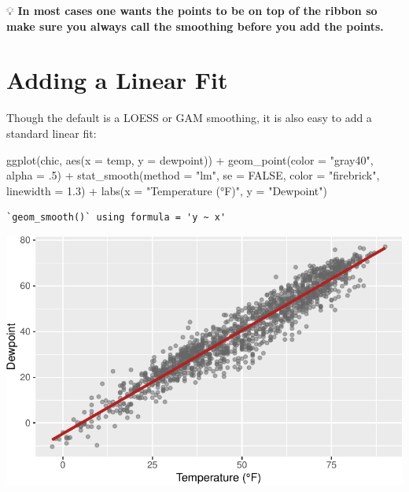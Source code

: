 \documentclass[
  letterpaper,
  DIV=11,
  numbers=noendperiod]{scrreprt}
\newenvironment{Shaded}{\begin{snugshade}}{\end{snugshade}}
\newcommand{\AttributeTok}[1]{\textcolor[rgb]{0.40,0.45,0.13}{#1}}
\newcommand{\ConstantTok}[1]{\textcolor[rgb]{0.56,0.35,0.01}{#1}}
\newcommand{\DecValTok}[1]{\textcolor[rgb]{0.68,0.00,0.00}{#1}}
\newcommand{\FloatTok}[1]{\textcolor[rgb]{0.68,0.00,0.00}{#1}}
\newcommand{\FunctionTok}[1]{\textcolor[rgb]{0.28,0.35,0.67}{#1}}
\newcommand{\NormalTok}[1]{\textcolor[rgb]{0.00,0.23,0.31}{#1}}
\newcommand{\SpecialCharTok}[1]{\textcolor[rgb]{0.37,0.37,0.37}{#1}}
\newcommand{\StringTok}[1]{\textcolor[rgb]{0.13,0.47,0.30}{#1}}
\begin{document}
💡 \textbf{In most cases one wants the points to be on top of the ribbon
so make sure you always call the smoothing before you add the points.}

\section{Adding a Linear Fit}\label{adding-a-linear-fit}

Though the default is a LOESS or GAM smoothing, it is also easy to add a
standard linear fit:

\begin{Shaded}
\begin{Highlighting}[]
\FunctionTok{ggplot}\NormalTok{(chic, }\FunctionTok{aes}\NormalTok{(}\AttributeTok{x =}\NormalTok{ temp, }\AttributeTok{y =}\NormalTok{ dewpoint)) }\SpecialCharTok{+}
   \FunctionTok{geom\_point}\NormalTok{(}\AttributeTok{color =} \StringTok{"gray40"}\NormalTok{, }\AttributeTok{alpha =}\NormalTok{ .}\DecValTok{5}\NormalTok{) }\SpecialCharTok{+}
   \FunctionTok{stat\_smooth}\NormalTok{(}\AttributeTok{method =} \StringTok{"lm"}\NormalTok{, }\AttributeTok{se =} \ConstantTok{FALSE}\NormalTok{,}
               \AttributeTok{color =} \StringTok{"firebrick"}\NormalTok{, }\AttributeTok{linewidth =} \FloatTok{1.3}\NormalTok{) }\SpecialCharTok{+}
   \FunctionTok{labs}\NormalTok{(}\AttributeTok{x =} \StringTok{"Temperature (°F)"}\NormalTok{, }\AttributeTok{y =} \StringTok{"Dewpoint"}\NormalTok{)}
\end{Highlighting}
\end{Shaded}

\begin{verbatim}
`geom_smooth()` using formula = 'y ~ x'
\end{verbatim}

\includegraphics{ch17_files/figure-pdf/LM-1.pdf}
\end{document}
